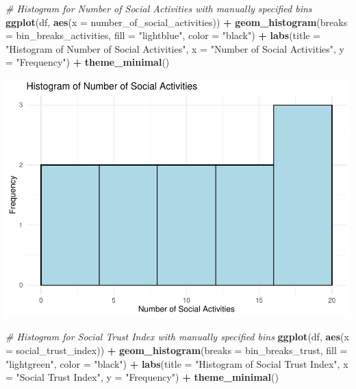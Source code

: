 \documentclass[
  11pt,
]{article}
\newenvironment{Shaded}{\begin{snugshade}}{\end{snugshade}}
\newcommand{\AttributeTok}[1]{\textcolor[rgb]{0.13,0.29,0.53}{#1}}
\newcommand{\CommentTok}[1]{\textcolor[rgb]{0.56,0.35,0.01}{\textit{#1}}}
\newcommand{\FunctionTok}[1]{\textcolor[rgb]{0.13,0.29,0.53}{\textbf{#1}}}
\newcommand{\NormalTok}[1]{#1}
\newcommand{\SpecialCharTok}[1]{\textcolor[rgb]{0.81,0.36,0.00}{\textbf{#1}}}
\newcommand{\StringTok}[1]{\textcolor[rgb]{0.31,0.60,0.02}{#1}}
\begin{document}
\begin{Shaded}
\begin{Highlighting}[]
\CommentTok{\# Histogram for Number of Social Activities with manually specified bins}
\FunctionTok{ggplot}\NormalTok{(df, }\FunctionTok{aes}\NormalTok{(}\AttributeTok{x =}\NormalTok{ number\_of\_social\_activities)) }\SpecialCharTok{+} \FunctionTok{geom\_histogram}\NormalTok{(}\AttributeTok{breaks =}\NormalTok{ bin\_breaks\_activities,}
    \AttributeTok{fill =} \StringTok{"lightblue"}\NormalTok{, }\AttributeTok{color =} \StringTok{"black"}\NormalTok{) }\SpecialCharTok{+} \FunctionTok{labs}\NormalTok{(}\AttributeTok{title =} \StringTok{"Histogram of Number of Social Activities"}\NormalTok{,}
    \AttributeTok{x =} \StringTok{"Number of Social Activities"}\NormalTok{, }\AttributeTok{y =} \StringTok{"Frequency"}\NormalTok{) }\SpecialCharTok{+} \FunctionTok{theme\_minimal}\NormalTok{()}
\end{Highlighting}
\end{Shaded}

\includegraphics{Problem-Sets/Answers-Files/Answers-PS1/unnamed-chunk-5-1.pdf}

\begin{Shaded}
\begin{Highlighting}[]
\CommentTok{\# Histogram for Social Trust Index with manually specified bins}
\FunctionTok{ggplot}\NormalTok{(df, }\FunctionTok{aes}\NormalTok{(}\AttributeTok{x =}\NormalTok{ social\_trust\_index)) }\SpecialCharTok{+} \FunctionTok{geom\_histogram}\NormalTok{(}\AttributeTok{breaks =}\NormalTok{ bin\_breaks\_trust,}
    \AttributeTok{fill =} \StringTok{"lightgreen"}\NormalTok{, }\AttributeTok{color =} \StringTok{"black"}\NormalTok{) }\SpecialCharTok{+} \FunctionTok{labs}\NormalTok{(}\AttributeTok{title =} \StringTok{"Histogram of Social Trust Index"}\NormalTok{,}
    \AttributeTok{x =} \StringTok{"Social Trust Index"}\NormalTok{, }\AttributeTok{y =} \StringTok{"Frequency"}\NormalTok{) }\SpecialCharTok{+} \FunctionTok{theme\_minimal}\NormalTok{()}
\end{Highlighting}
\end{Shaded}
\end{document}
